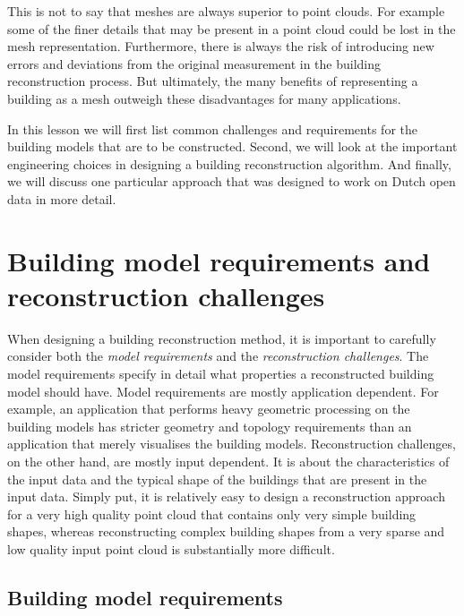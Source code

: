 This is not to say that meshes are always superior to point clouds. 
For example some of the finer details that may be present in a point cloud could be lost in the mesh representation. 
Furthermore, there is always the risk of introducing new errors and deviations from the original measurement in the building reconstruction process. 
But ultimately, the many benefits of representing a building as a mesh outweigh these disadvantages for many applications.

In this lesson we will first list common challenges and requirements for the building models that are to be constructed. Second, we will look at the important engineering choices in designing a building reconstruction algorithm. And finally, we will discuss one particular approach that was designed to work on Dutch open data in more detail.

%
\section{Building model requirements and reconstruction challenges}
When designing a building reconstruction method, it is important to carefully consider both the \emph{model requirements} and the \emph{reconstruction challenges}. 
The model requirements specify in detail what properties a reconstructed building model should have. 
Model requirements are mostly application dependent.
For example, an application that performs heavy geometric processing on the building models has stricter geometry and topology requirements than an application that merely visualises the building models.
Reconstruction challenges, on the other hand, are mostly input dependent. 
It is about the characteristics of the input data and the typical shape of the buildings that are present in the input data.
Simply put, it is relatively easy to design a reconstruction approach for a very high quality point cloud that contains only very simple building shapes, whereas reconstructing complex building shapes from a very sparse and low quality input point cloud is substantially more difficult.

\subsection{Building model requirements}

